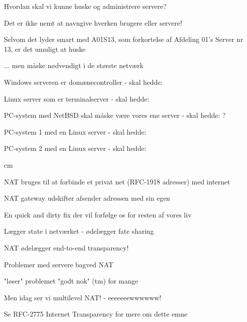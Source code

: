 \documentclass[Screen16to9,17pt]{foils}
\begin{document}
\begin{list1}
  \item Hvordan skal vi kunne huske og administrere servere?
\item Det er ikke nemt at navngive hverken brugere eller servere!
\item Selvom det lyder smart med A01S13, som forkortelse af Afdeling
  01's Server nr 13, er det umuligt at huske
\item ... men måske nødvendigt i de største netværk
  \begin{list2}

\item Windows serveren er domænecontroller - skal hedde:
\item Linux server som er terminalserver - skal hedde:
\item PC-system med NetBSD skal måske være vores ene server - skal hedde: ?
\item PC-system 1 med en Linux server - skal hedde:
\item PC-system 2 med en Linux server - skal hedde:
  \end{list2}
\end{list1}





 cm
\begin{list2}
\item NAT bruges til at forbinde et privat net (RFC-1918 adresser) med internet
\item NAT gateway udskifter afsender adressen med sin egen
\item En quick and dirty fix der vil forfølge os for resten af vores
  liv
\item Lægger state i netværket - ødelægger fate sharing
\end{list2}








\begin{list2}
\item NAT ødelægger end-to-end transparency!
\item Problemer med servere bagved NAT
\item "løser" problemet "godt nok" (tm) for mange
\item Men idag ser vi multilevel NAT! - eeeeeeewwwwww!
\item Se RFC-2775 Internet Transparency for mere om dette emne
\end{list2}
\end{document}
